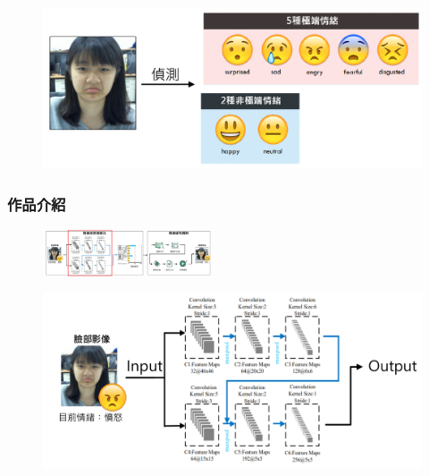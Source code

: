 \documentclass[10pt, conference, compsocconf]{beamer}
\begin{document}
\begin{CJK}{UTF8}{}
\begin{frame}
\vspace{-9mm}
\begin{figure}[!t]
\begin{center}
\includegraphics[width=12.3cm]{./Figures/Detect7Emotion.pdf}
\end{center}
\end{figure}

\end{frame}

\begin{frame}
\frametitle{作品介紹}
\begin{figure}[t]
\begin{flushright}
\includegraphics[width=5cm]{./Figures/framework2.pdf}
\end{flushright}
\end{figure}

\vspace{-5mm}
\begin{figure}[!t]
\begin{center}
\includegraphics[width=12.3cm]{./Figures/FrameworkFirst.pdf}
\end{center}
\end{figure}

\end{frame}


\end{CJK}
\end{document}
